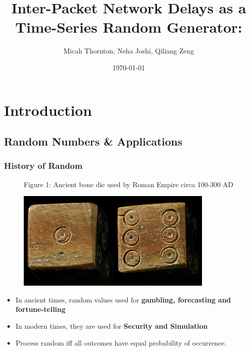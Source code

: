 \documentclass{beamer}
\title{Inter-Packet Network Delays as a Time-Series Random Generator:}
\author{Micah Thornton, Neha Joshi, Qiliang Zeng}
\date{\today}
\begin{document}
\begin{frame}
\maketitle{}
\end{frame}

\section{Introduction}

\begin{frame}
\tableofcontents{}
\end{frame}
\begin{frame}
\end{frame}


\subsection{Random Numbers \& Applications}

\begin{frame}
\frametitle{History of Random}

\begin{figure}
\vspace{- 1 em}
{\tiny \textsc Figure 1: Ancient bone die used by Roman Empire circa 100-300 AD}

\begin{center}
\includegraphics[scale=0.45]{images/ufdie.jpg}
\end{center}
\end{figure}

\vspace{- 1.5 em}
\begin{itemize}
		\item In ancient times, random values used for \textbf{gambling,  forecasting and fortune-telling}
		\item In modern times, they are used for \textbf{Security and Simulation}
		\item Process random iff all outcomes have equal probability of occurrence. 
\end{itemize}
\end{frame}
\end{document}
